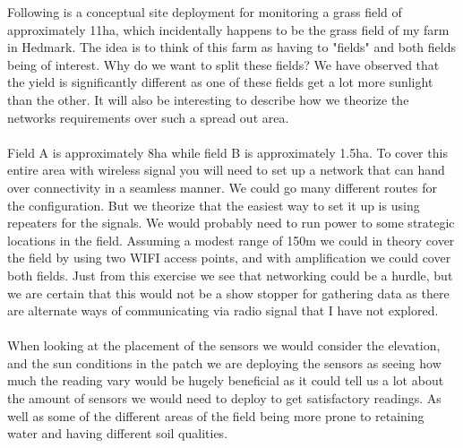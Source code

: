 \documentclass[]{uiophd}
\begin{document}
 Following is a conceptual site deployment for monitoring a grass field of approximately 11ha, which incidentally happens to be the grass field of my farm in Hedmark. The idea is to think of this farm as having to "fields" and both fields being of interest. Why do we want to split these fields? We have observed that the yield is significantly different as one of these fields get a lot more sunlight than the other. It will also be interesting to describe how we theorize the networks requirements over such a spread out area.
 \\\\
 Field A is approximately 8ha while field B is approximately 1.5ha. To cover this entire area with wireless signal you will need to set up a network that can hand over connectivity in a seamless manner. We could go many different routes for the configuration. But we theorize that the easiest way to set it up is using repeaters for the signals. We would probably need to run power to some strategic locations in the field. Assuming a modest range of 150m we could in theory cover the field by using two WIFI access points, and with amplification we could cover both fields. Just from this exercise we see that networking could be a hurdle, but we are certain that this would not be a show stopper for gathering data as there are alternate ways of communicating via radio signal that I have not explored.
 \\\\
 When looking at the placement of the sensors we would consider the elevation, and the sun conditions in the patch we are deploying the sensors as seeing how much the reading vary would be hugely beneficial as it could tell us a lot about the amount of sensors we would need to deploy to get satisfactory readings. As well as some of the different areas of the field being more prone to retaining water and having different soil qualities. 
 
\end{document}
